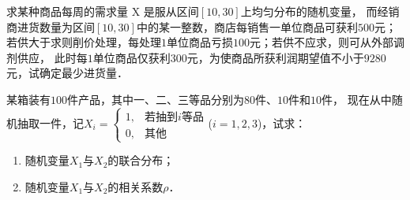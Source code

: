 \documentclass[plain,noanswer,medmath]{../../template/jnuexam}
\begin{document}

\begin{problem}
求某种商品每周的需求量 X 是服从区间$\left[10,30 \right]$上均匀分布的随机变量，
而经销商进货数量为区间$\left[10,30 \right]$中的某一整数，商店每销售一单位商品可获利$500$元；
若供大于求则削价处理，每处理$1$单位商品亏损$100$元；若供不应求，则可从外部调剂供应，
此时每$1$单位商品仅获利$300$元，为使商品所获利润期望值不小于$9280$元，试确定最少进货量．
\end{problem}



\begin{problem}
某箱装有$100$件产品，其中一、二、三等品分别为$80$件、$10$件和$10$件，
现在从中随机抽取一件，记$X_i = \begin{cases}
  1, & \text{若抽到$i$等品} \\
  0, & \text{其他}
\end{cases}$($i = 1,2,3$)，试求：
\begin{enumerate}
\item 随机变量$X_1$与$X_2$的联合分布；
\item 随机变量$X_1$与$X_2$的相关系数$\rho$．
\end{enumerate}
\end{problem}
\end{document}
